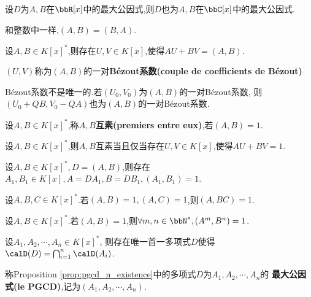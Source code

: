 \begin{rqq}
    设$D$为$A, B$在$\bbR[x]$中的最大公因式,则$D$也为$A, B$在$\bbC[x]$中的最大公因式.
\end{rqq}

\begin{rqq}
    和整数中一样,$(A, B) = (B, A)$.
\end{rqq}

\begin{prop}
    设$A, B \in K[x]^*$,则存在$U, V \in K[x]$,使得$AU + BV = (A, B)$.
\end{prop}

\begin{rqq}
    $(U, V)$称为$(A, B)$的一对\textbf{Bézout系数(couple de coefficients de Bézout)}
\end{rqq}

\begin{rqq}
    Bézout系数不是唯一的.若$(U_0, V_0)$为$(A, B)$的一对Bézout系数,
    则$(U_0 + QB, V_0 - QA)$也为$(A, B)$的一对Bézout系数.
\end{rqq}

\begin{deff}
    设$A, B \in K[x]^*$,称$A, B$\textbf{互素(premiers entre eux)},若$(A, B) = 1$.
\end{deff}

\begin{prop}
    设$A, B \in K[x]^*$,则$A, B$互素当且仅当存在$U, V \in K[x]$,使得$AU + BV = 1$.
\end{prop}

\begin{prop}
    设$A, B \in K[x]^*, D = (A, B)$,则存在$A_1, B_1 \in K[x], A = DA_1, B = DB_1, (A_1, B_1) = 1$.
\end{prop}

\begin{prop}
    设$A, B, C \in K[x]^*$.若$(A, B) = 1, (A, C) = 1$,则$(A, BC) = 1$.
\end{prop}

\begin{cor}
    设$A, B \in K[x]^*$.若$(A, B) = 1$,则$\forall m, n \in \bbN^*, (A^m, B^n) = 1$.
\end{cor}

\begin{prop}\label{prop:pgcd_n_existence}
    设$A_1, A_2, \cdots, A_n \in K[x]^*$,
    则存在唯一首一多项式$D$使得$\calD(D) = \bigcap_{i=1}^n \calD(A_i)$.
\end{prop}

\begin{deff}
    称Proposition \ref{prop:pgcd_n_existence}中的多项式$D$为$A_1, A_2, \cdots, A_n$的
    \textbf{最大公因式(le PGCD)},记为$(A_1, A_2, \cdots, A_n)$.
\end{deff}

